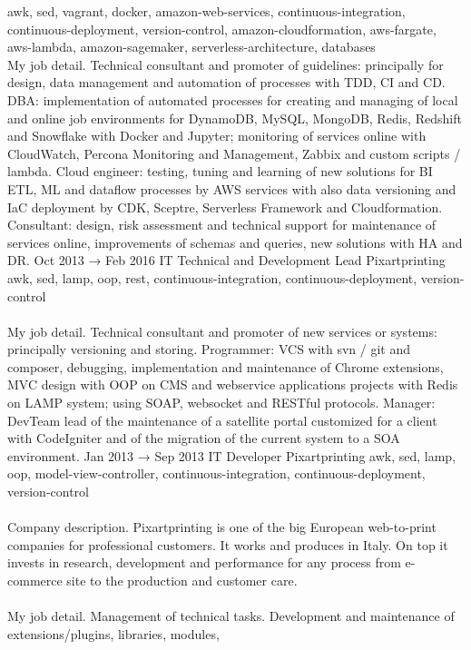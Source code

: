 \documentclass[9pt]{stackoverflow} %
\begin{document}
\begin{tcolorbox}
{\begin{entrylist}
		{{awk, sed, vagrant, docker, amazon-web-services, continuous-integration, continuous-deployment, version-control, amazon-cloudformation, aws-fargate, aws-lambda, amazon-sagemaker, serverless-architecture, databases}\\
		My job detail. Technical consultant and promoter of guidelines: principally for design, data management and automation of processes with TDD, CI and CD.
		DBA: implementation of automated processes for creating and managing of local and online job environments for DynamoDB, MySQL, MongoDB, Redis, Redshift and Snowflake with Docker and Jupyter; monitoring of services online with CloudWatch, Percona Monitoring and Management, Zabbix and custom scripts / lambda.
		Cloud engineer: testing, tuning and learning of new solutions for BI ETL, ML and dataflow processes by AWS services with also data versioning and IaC deployment by CDK, Sceptre, Serverless Framework and Cloudformation.
		Consultant: design, risk assessment and technical support for maintenance of services online, improvements of schemas and queries, new solutions with HA and DR.}
	\entry
		{Oct 2013 → Feb 2016}
		{IT Technical and Development Lead}
		{Pixartprinting}
		{{awk, sed, lamp, oop, rest, continuous-integration, continuous-deployment, version-control}\\\\
		My job detail. Technical consultant and promoter of new services or systems: principally versioning and storing. Programmer:
		VCS with svn / git and composer, debugging, implementation and maintenance of Chrome extensions, MVC design with OOP
		on CMS and webservice applications projects with Redis on LAMP system; using SOAP, websocket and RESTful protocols.
		Manager: DevTeam lead of the maintenance of a satellite portal customized for a client with CodeIgniter and of the migration of
		the current system to a SOA environment.}
	\entry
		{Jan 2013 → Sep 2013}
		{IT Developer}
		{Pixartprinting}
		{{awk, sed, lamp, oop, model-view-controller, continuous-integration, continuous-deployment, version-control}\\\\
		Company description. Pixartprinting is one of the big European web-to-print companies for professional customers. It works
		and produces in Italy. On top it invests in research, development and performance for any process from e-commerce site to
		the production and customer care.\\\\
		My job detail. Management of technical tasks. Development and maintenance of extensions/plugins, libraries, modules,
}
\end{entrylist}}
\end{tcolorbox}
\end{document}
